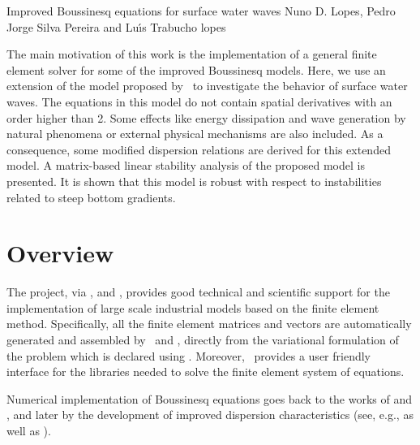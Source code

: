               {Improved Boussinesq equations for surface water waves}
              {Nuno D. Lopes, Pedro Jorge Silva Pereira and Lu{\'\i}s Trabucho}
              {lopes}

The main motivation of this work is the implementation of a
general finite element solver for some of the improved Boussinesq
models.  Here, we use an extension
of the model proposed by~\citet{ZhaoTengCheng2004} to
investigate the behavior of surface water waves. The
equations in this model do not contain spatial derivatives
with an order higher than 2. Some effects like
 energy dissipation and wave generation by natural
phenomena or external physical mechanisms are also included.
As a consequence, some modified dispersion relations are
derived for this extended model. A matrix-based linear
stability analysis of the proposed model is presented.
It is shown that this model is robust with respect to
instabilities related to steep bottom gradients.

\section{Overview}
The \fenics project, via \dolfin, \ufl and \ffc, provides
good technical and scientific support for the implementation
of large scale industrial models based on the finite element
method. Specifically, all the
finite element matrices and vectors are automatically
generated and assembled by \dolfin\ and \ffc, directly from
the variational formulation of the problem which is declared
using \ufl. Moreover, \dolfin\ provides a user friendly
interface for the libraries needed to solve the finite
element system of equations.

Numerical implementation of Boussinesq equations goes back to
the works of \citet{Peregrine1967} and \citet{Wu1981}, and later
by the development of improved dispersion characteristics (see,
e.g., \citet{MadsenEtAl1991,Nwogu1993,ChenLiu1994} as well as
\citet{BejiNadaoka1996}).


